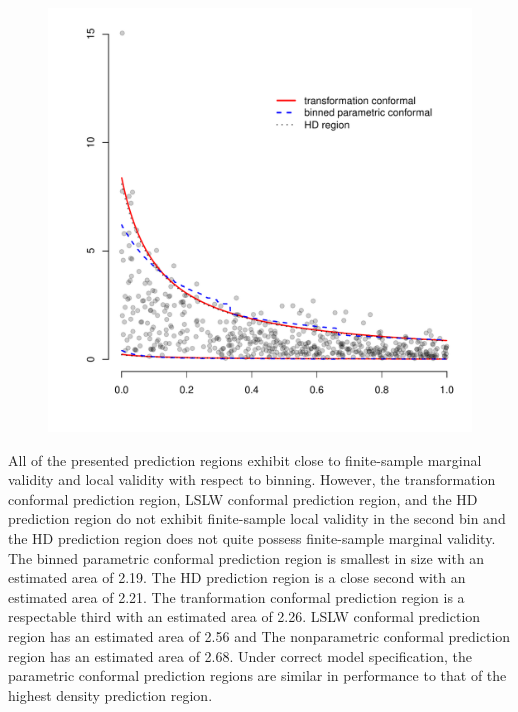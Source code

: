 \documentclass[11pt]{article}\usepackage[]{graphicx}\usepackage[]{color}
\makeatletter
\def\maxwidth{ %
  \ifdim\Gin@nat@width>\linewidth
    \linewidth
  \else
    \Gin@nat@width
  \fi
}
\newenvironment{knitrout}{}{} %
\makeatother
\begin{document}
\begin{figure}[h!]
\begin{center}
\begin{knitrout}
\color{fgcolor}
\includegraphics[width=\maxwidth]{figure/gammasimexample2-1} 

\end{knitrout}
\end{center}
\label{Fig:plots2}
\end{figure}


All of the presented prediction regions exhibit close to finite-sample 
marginal validity and local validity with respect to binning.  However, 
the transformation conformal prediction region, LSLW conformal prediction 
region, and the HD prediction region do not exhibit finite-sample local 
validity in the second bin and the HD prediction region does not quite 
possess finite-sample marginal validity.  
The binned parametric conformal prediction region is smallest in size 
with an estimated area of 2.19.  The HD prediction region is a close second 
with an estimated area of 2.21.  The tranformation conformal prediction 
region is a respectable third with an estimated area of 2.26.
LSLW conformal prediction region has an estimated area of 2.56 and 
The nonparametric conformal prediction region has an estimated area of 2.68. 
Under correct model specification, the parametric conformal prediction 
regions are similar in performance to that of the highest density prediction 
region.
\end{document}
